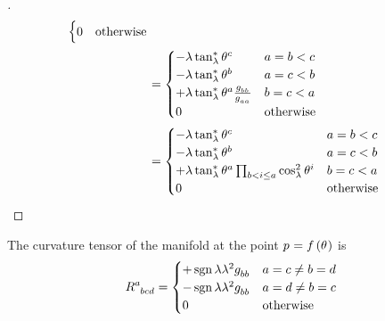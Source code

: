 \documentclass[../main.tex]{subfiles}
\begin{document}
\begin{proof}[]
\begin{align*}
\begin{cases}
0&\text{otherwise}\\
\end{cases}\\
&=\begin{cases}
-\lambda\tan_\lambda^\ast\tensor{\theta}{^c}&\text{$a=b<c$}\\
-\lambda\tan_\lambda^\ast\tensor{\theta}{^b}&\text{$a=c<b$}\\
+\lambda\tan_\lambda^\ast\tensor{\theta}{^a}\frac{\tensor{g}{_b_b}}{\tensor{g}{_a_a}}&\text{$b=c<a$}\\
0&\text{otherwise}\\
\end{cases}\\
&=\begin{cases}
-\lambda\tan_\lambda^\ast\tensor{\theta}{^c}&\text{$a=b<c$}\\
-\lambda\tan_\lambda^\ast\tensor{\theta}{^b}&\text{$a=c<b$}\\
+\lambda\tan_\lambda^\ast\tensor{\theta}{^a}\prod_{b<i\le a}{\cos_\lambda^2\tensor{\theta}{^i}}&\text{$b=c<a$}\\
0&\text{otherwise}\\
\end{cases}\qedhere
\end{align*}
\end{proof}
\begin{lemma}\label{M:CurvatureTensor}
The curvature tensor of the manifold
at the point $\tensor{p}{}=f\left(\tensor{\theta}{}\right)$
is
\begin{equation*}
\tensor{R}{^a_b_c_d}
=
\begin{cases}
+\sign{\lambda}\lambda^2\tensor{g}{_b_b}&\text{$a=c\ne b=d$}\\
-\sign{\lambda}\lambda^2\tensor{g}{_b_b}&\text{$a=d\ne b=c$}\\
0&\text{otherwise}\\
\end{cases}
\end{equation*}
\end{lemma}
\end{document}
